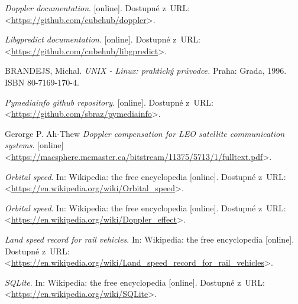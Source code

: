 \begin{literatura}{99}
    \emph{Doppler documentation}. [online].
    Dostupné z~URL:\\
    <\url{https://github.com/cubehub/doppler}>.

    \emph{Libgpredict documentation}. [online].
    Dostupné z~URL:\\
    <\url{https://github.com/cubehub/libgpredict}>.

    BRANDEJS, Michal.
    \emph{UNIX - Linux: praktický průvodce.} Praha: Grada, 1996. ISBN 80-7169-170-4.

    \emph{Pymediainfo github repository}. [online].
    Dostupné z~URL:\\
    <\url{https://github.com/sbraz/pymediainfo}>.

    Gerorge P. Ah-Thew
    \emph{Doppler compensation for LEO satellite communication systems}. [online]
    <\url{https://macsphere.mcmaster.ca/bitstream/11375/5713/1/fulltext.pdf}>.

    \emph{Orbital speed}. In: Wikipedia: the free encyclopedia\/ [online].
    Dostupné z~URL:\\
    <\url{https://en.wikipedia.org/wiki/Orbital_speed}>.

    \emph{Orbital speed}. In: Wikipedia: the free encyclopedia\/ [online].
    Dostupné z~URL:\\
    <\url{https://en.wikipedia.org/wiki/Doppler_effect}>.

    \emph{Land speed record for rail vehicles}. In: Wikipedia: the free encyclopedia\/ [online].
    Dostupné z~URL:\\
    <\url{https://en.wikipedia.org/wiki/Land_speed_record_for_rail_vehicles}>.

    \emph{SQLite}. In: Wikipedia: the free encyclopedia\/ [online].
    Dostupné z~URL:\\
    <\url{https://en.wikipedia.org/wiki/SQLite}>.


\end{literatura}
